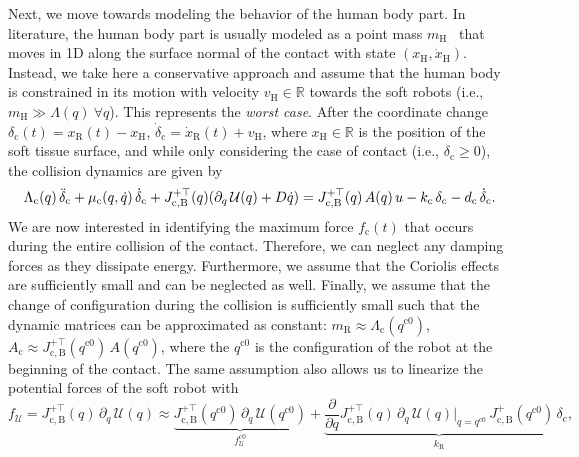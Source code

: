 Next, we move towards modeling the behavior of the human body part. In literature, the human body part is usually modeled as a point mass $m_\mathrm{H}$~\citep{haddadin2011safe, Isots_15066_2016} that moves in 1D along the surface normal of the contact with state $(x_\mathrm{H},\dot{x}_\mathrm{H})$. Instead, we take here a conservative approach and assume that the human body is constrained in its motion with velocity $v_\mathrm{H} \in \mathbb{R}$ towards the soft robots (i.e., $m_\mathrm{H} \gg \Lambda(q) \: \forall q$). This represents the \emph{worst case}.
After the coordinate change $\delta_\mathrm{c}(t) = x_\mathrm{R}(t) - x_\mathrm{H}$, $\dot{\delta}_\mathrm{c} = \dot{x}_\mathrm{R}(t) + v_\mathrm{H}$, %
where $x_\mathrm{H} \in \mathbb{R}$ is the position of the soft tissue surface, and while only considering the case of contact (i.e., $\delta_\mathrm{c} \geq 0$), the collision dynamics are given by
\begin{equation}
    \Lambda_\mathrm{c}(q) \, \Ddot{\delta}_\mathrm{c} + \mu_\mathrm{c}(q,\dot{q}) \, \dot{\delta}_\mathrm{c} + J_\mathrm{c,B}^{+\top}(q) ( \partial_{q} \, \mathcal{U}(q) + D \dot{q} ) = J_\mathrm{c,B}^{+\top}(q) \, A(q) \, u - k_\mathrm{c} \, \delta_\mathrm{c} - d_\mathrm{c} \, \dot{\delta}_\mathrm{c}.
\end{equation}
We are now interested in identifying the maximum force $f_\mathrm{c}(t)$ that occurs during the entire collision of the contact.
Therefore, we can neglect any damping forces as they dissipate energy.
Furthermore, we assume that the Coriolis effects are sufficiently small and can be neglected as well.
Finally, we assume that the change of configuration during the collision is sufficiently small such that the dynamic matrices can be approximated as constant: $m_\mathrm{R} \approx \Lambda_\mathrm{c}(q^{\mathrm{c}0})$, 
$A_\mathrm{c} \approx J_\mathrm{c,B}^{+\top}(q^{\mathrm{c}0}) \, A(q^{\mathrm{c}0})$, where the $q^{\mathrm{c}0}$ is the configuration of the robot at the beginning of the contact.
The same assumption also allows us to linearize the potential forces of the soft robot with 
\begin{equation}
    f_{\mathcal{U}} = J_\mathrm{c,B}^{+\top}(q) \, \partial_{q} \, \mathcal{U}(q) \approx \underbrace{J_\mathrm{c,B}^{+\top}(q^{\mathrm{c}0}) \, \partial_{q} \, \mathcal{U}(q^{\mathrm{c}0})}_{f_{\mathcal{U}}^{\mathrm{c}0}} + \underbrace{\frac{\partial}{\partial q} J_\mathrm{c,B}^{+\top}(q) \, \partial_{q} \, \mathcal{U}(q) \Big |_{q=q^{\mathrm{c}0}} \,  J_\mathrm{c,B}^{+}(q^{\mathrm{c}0})}_{k_\mathrm{R}}  \, \delta_\mathrm{c},
\end{equation}
